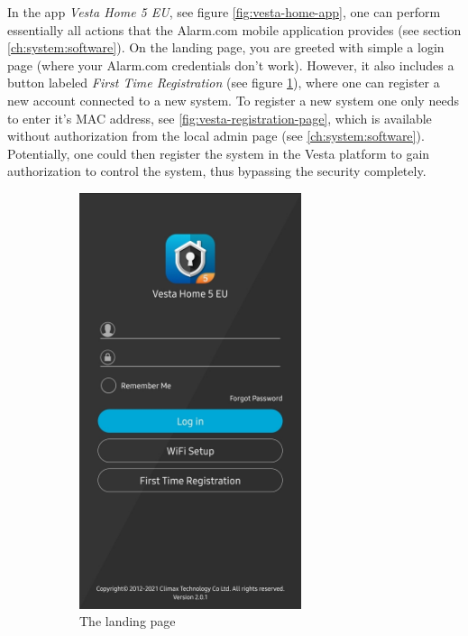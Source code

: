 In the app \textit{Vesta Home 5 EU}, see figure \ref{fig:vesta-home-app}, one can perform essentially all actions that the Alarm.com mobile application provides (see section \ref{ch:system:software}). On the landing page, you are greeted with simple a login page (where your Alarm.com credentials don't work). However, it also includes a button labeled \textit{First Time Registration} (see figure \ref{fig:vesta-landing-page}), where one can register a new account connected to a new system. To register a new system one only needs to enter it's MAC address, see \ref{fig:vesta-registration-page}, which is available without authorization from the local admin page (see \ref{ch:system:software}). Potentially, one could then register the system in the Vesta platform to gain authorization to control the system, thus bypassing the security completely.
\begin{figure}[!ht]
    \centering
    \begin{subfigure}[t]{0.5\textwidth}
        \includegraphics[height=4.8in]{images/6-pentesting/vesta-home-landing-page.jpg}
        \caption{The landing page}
        \label{fig:vesta-landing-page}
    \end{subfigure}%
    ~
    \begin{subfigure}[t]{0.5\textwidth}

\end{subfigure}
\end{figure}
